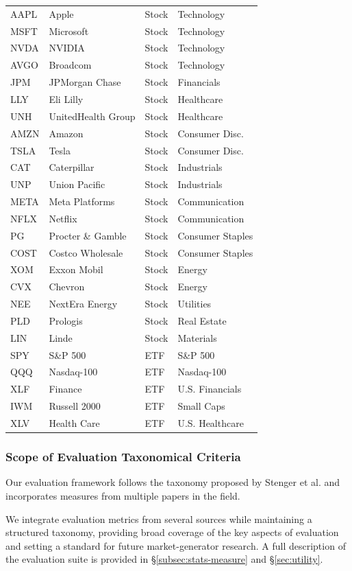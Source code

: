 \begin{table}[t]
\begin{tabular}{l l l l}
        AAPL & Apple & Stock & Technology \\
        MSFT & Microsoft & Stock & Technology \\
        NVDA & NVIDIA & Stock & Technology \\
        AVGO & Broadcom & Stock & Technology \\
        JPM & JPMorgan Chase & Stock & Financials \\
        LLY & Eli Lilly & Stock & Healthcare \\
        UNH & UnitedHealth Group & Stock & Healthcare \\
        AMZN & Amazon & Stock & Consumer Disc. \\
        TSLA & Tesla & Stock & Consumer Disc. \\
        CAT & Caterpillar & Stock & Industrials \\
        UNP & Union Pacific & Stock & Industrials \\
        META & Meta Platforms & Stock & Communication \\
        NFLX & Netflix & Stock & Communication \\
        PG & Procter \& Gamble & Stock & Consumer Staples \\
        COST & Costco Wholesale & Stock & Consumer Staples \\
        XOM & Exxon Mobil & Stock & Energy \\
        CVX & Chevron & Stock & Energy \\
        NEE & NextEra Energy & Stock & Utilities \\
        PLD & Prologis & Stock & Real Estate \\
        LIN & Linde & Stock & Materials \\
        SPY & S\&P 500& ETF & S\&P 500 \\
        QQQ & Nasdaq-100& ETF & Nasdaq-100 \\
        XLF & Finance & ETF & U.S. Financials \\
        IWM & Russell 2000& ETF & Small Caps \\
        XLV & Health Care & ETF & U.S. Healthcare \\
        \hline
        \end{tabular}
    \end{table}

    \subsubsection{Scope of Evaluation Taxonomical Criteria}
      Our evaluation framework follows the taxonomy proposed by
      Stenger et al. \cite{Stenger24} and incorporates measures from
      multiple papers in the field.

      We integrate evaluation metrics from several sources while
      maintaining a structured taxonomy, providing broad coverage of
      the key aspects of evaluation and setting a standard for future
      market-generator research. A full description of the evaluation
      suite is provided in §\ref{subsec:stats-measure} and
      §\ref{sec:utility}.
